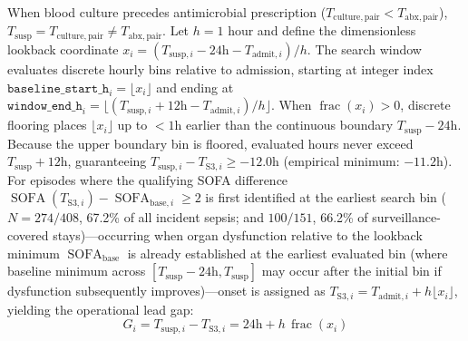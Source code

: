 \documentclass[10pt,twocolumn,a4paper]{article}
\begin{document}
When blood culture precedes antimicrobial prescription ($T_{\mathrm{culture,pair}} < T_{\mathrm{abx,pair}}$), $T_{\mathrm{susp}} = T_{\mathrm{culture,pair}} \ne T_{\mathrm{abx,pair}}$. Let $h = 1\text{ hour}$ and define the dimensionless lookback coordinate $x_i = (T_{\mathrm{susp}, i} - 24\text{h} - T_{\text{admit}, i})/h$. The search window evaluates discrete hourly bins relative to admission, starting at integer index $\texttt{baseline\_start\_h}_i = \lfloor x_i \rfloor$ and ending at $\texttt{window\_end\_h}_i = \lfloor(T_{\mathrm{susp}, i} + 12\text{h} - T_{\text{admit}, i})/h\rfloor$. When $\operatorname{frac}(x_i) > 0$, discrete flooring places $\lfloor x_i \rfloor$ up to $<1\text{h}$ earlier than the continuous boundary $T_{\mathrm{susp}} - 24\text{h}$. Because the upper boundary bin is floored, evaluated hours never exceed $T_{\mathrm{susp}} + 12\text{h}$, guaranteeing $T_{\mathrm{susp}, i} - T_{\text{S3}, i} \ge -12.0\text{h}$ (empirical minimum: $-11.2\text{h}$). For episodes where the qualifying SOFA difference $\operatorname{SOFA}(T_{\mathrm{S3}, i}) - \operatorname{SOFA}_{\mathrm{base}, i} \ge 2$ is first identified at the earliest search bin ($N=274/408$, 67.2\% of all incident sepsis; and $100/151$, 66.2\% of surveillance-covered stays)—occurring when organ dysfunction relative to the lookback minimum $\operatorname{SOFA}_{\mathrm{base}}$ is already established at the earliest evaluated bin (where baseline minimum across $[T_{\mathrm{susp}}-24\mathrm{h}, T_{\mathrm{susp}}]$ may occur after the initial bin if dysfunction subsequently improves)—onset is assigned as $T_{\text{S3}, i} = T_{\text{admit}, i} + h\lfloor x_i \rfloor$, yielding the operational lead gap:
\begin{equation}
G_i = T_{\mathrm{susp}, i} - T_{\text{S3}, i} = 24\text{h} + h\,\operatorname{frac}(x_i)
\end{equation}
\end{document}
